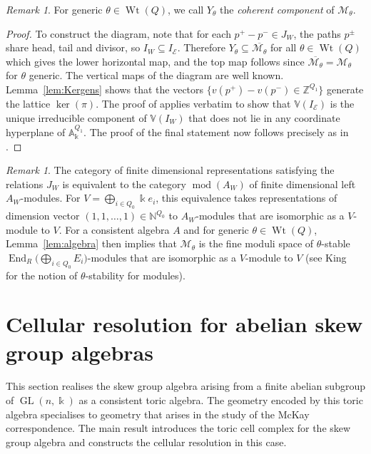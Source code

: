 \documentclass[11pt,a4paper]{amsart}
\numberwithin{equation}{section}
\theoremstyle{definition}
\theoremstyle{remark}
\newtheorem{remark}[theorem]{Remark}
\newcommand{\kk}{\ensuremath{\Bbbk}}
\newcommand{\NN}{\ensuremath{\mathbb{N}}}
\newcommand{\ZZ}{\ensuremath{\mathbb{Z}}}
\newcommand{\two}{\ensuremath{(\mathrm{ii})}}
\newcommand{\End}{\operatorname{End}}
\newcommand{\GL}{\operatorname{GL}}
\newcommand{\Ker}{\operatorname{ker}}
\newcommand{\Wt}{\operatorname{Wt}}
\newcommand{\modAPhi}{\operatorname{mod}(\ensuremath{A_W})}
\begin{document}
 \begin{remark}
For generic $\theta\in \Wt(Q)$, we call $Y_\theta$ the \emph{coherent component} of $\mathcal{M}_\theta$. 
\end{remark}
\begin{proof}
To construct the diagram, note that for each $p^+-p^-\in J_W$, the paths $p^{\pm}$ share head, tail and divisor, so $I_W\subseteq I_{\mathscr{E}}$. Therefore $Y_\theta\subseteq \overline{\mathcal{M}_\theta}$ for all $\theta\in \Wt(Q)$ which gives the lower horizontal map, and the top map follows since $\overline{\mathcal{M}_\theta} = \mathcal{M}_\theta$ for $\theta$ generic. The vertical maps of the diagram are well known.  Lemma~\ref{lem:Kergens} shows that the vectors $\{v(p^+)-v(p^-)\in \ZZ^{Q_1}\}$ generate the lattice $\Ker(\pi)$. The proof of \cite[Theorem~3.10]{CMT1} applies verbatim to show that $\mathbb{V}(I_{\mathscr{E}})$ is the unique irreducible component of $\mathbb{V}(I_W)$ that does not lie in any coordinate hyperplane of $\mathbb{A}^{Q_1}_\kk$.  The proof of the final statement now follows precisely as in \cite[Theorem~4.3\two]{CMT1}.
\end{proof}
 

\begin{remark}
 The category of finite dimensional representations satisfying the relations $J_W$ is equivalent to the category $\modAPhi$ of finite dimensional left $A_W$-modules.  For $V=\bigoplus_{i \in Q_0} \kk e_i$, this equivalence takes representations of dimension vector $(1,1,\dots,1)\in \NN^{Q_0}$ to $A_W$-modules that are isomorphic as a $V$-module to $V$.  For a consistent algebra $A$ and for generic $\theta\in \Wt(Q)$, Lemma~\ref{lem:algebra} then implies that $\mathcal{M}_\theta$ is the fine moduli space of $\theta$-stable $\End_R\bigl( \bigoplus_{i \in Q_0} E_i \bigr)$-modules that are isomorphic as a $V$-module to $V$ (see King~\cite{King} for the notion of $\theta$-stability for modules).
 \end{remark}





\section{Cellular resolution for abelian skew group algebras}
\label{sec:McKay}
This section realises the skew group algebra arising from a finite abelian subgroup of $\GL(n,\kk)$ as a consistent toric algebra. The geometry encoded by this toric algebra specialises to geometry that arises in the study of the McKay correspondence. The main result introduces the toric cell complex for the skew group algebra and constructs the cellular resolution in this case.
\end{document}
